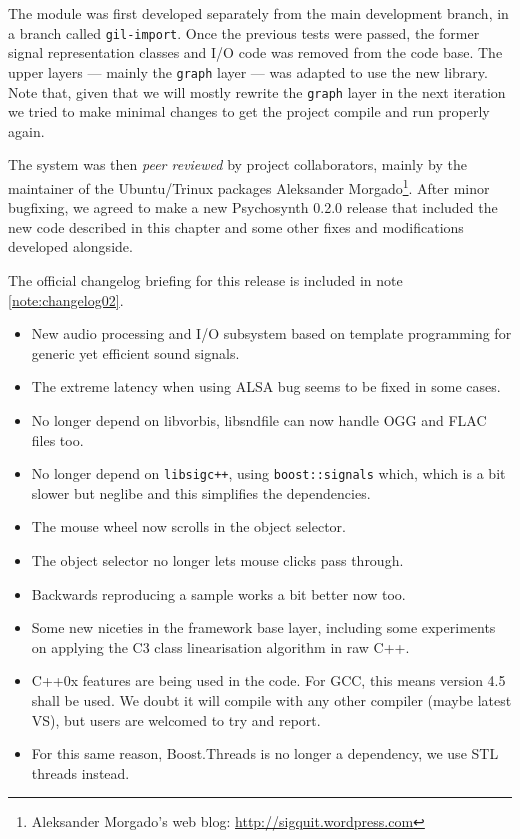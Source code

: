 The module was first developed separately from the main development
branch, in a branch called \texttt{gil-import}. Once the previous
tests were passed, the former signal representation classes and I/O
code was removed from the code base. The upper layers --- mainly the
\texttt{graph} layer --- was adapted to use the new library. Note
that, given that we will mostly rewrite the \texttt{graph} layer in
the next iteration we tried to make minimal changes to get the project
compile and run properly again.

The system was then \emph{peer reviewed} by project
collaborators, mainly by the maintainer of the Ubuntu/Trinux packages
Aleksander Morgado\footnote{Aleksander Morgado's web blog:
  \url{http://sigquit.wordpress.com}}. After minor bugfixing, we
agreed to make a new Psychosynth 0.2.0 release that included the new
code described in this chapter and some other fixes and modifications
developed alongside.

The official changelog briefing for this release is included in note
\ref{note:changelog02}.

\begin{mynote}
\label{note:changelog02}
\begin{itemize}
\item New audio processing and I/O subsystem based on template
  programming for generic yet efficient sound signals.

\item The extreme latency when using ALSA bug seems to be fixed in
  some cases.

\item No longer depend on libvorbis, libsndfile can now handle OGG and
  FLAC files too.

\item No longer depend on \texttt{libsigc++}, using
  \texttt{boost::signals} which, which is a bit slower but neglibe and
  this simplifies the dependencies.

\item The mouse wheel now scrolls in the object selector.

\item The object selector no longer lets mouse clicks pass through.  

\item Backwards reproducing a sample works a bit better now too.

\item Some new niceties in the framework base layer, including some
  experiments on applying the C3 class linearisation algorithm in raw
  C++.

\item C++0x features are being used in the code. For GCC, this means
  version 4.5 shall be used. We doubt it will compile with any other
  compiler (maybe latest VS), but users are welcomed to try and
  report.

\item For this same reason, Boost.Threads is no longer a dependency,
  we use STL threads instead.
\end{itemize}
\end{mynote}

